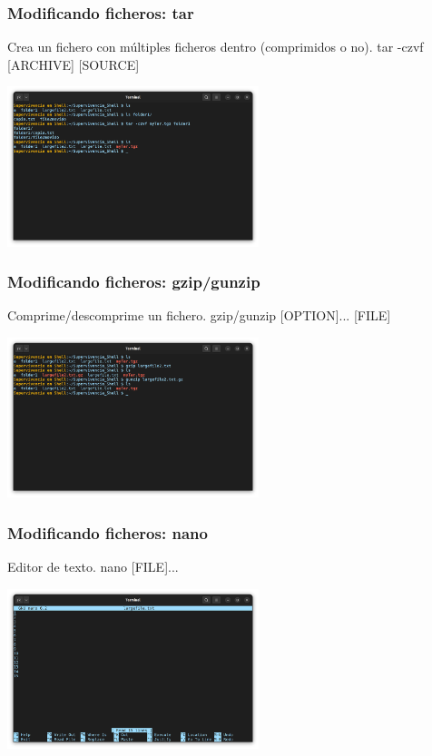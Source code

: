 \documentclass[10pt]{beamer}
\begin{document}
	\begin{frame}
		\frametitle{Modificando ficheros: tar}
		\begin{alertblock}{Crea un fichero con múltiples ficheros dentro (comprimidos o no).}
			tar -czvf [ARCHIVE] [SOURCE]
		\end{alertblock}
		\begin{center}
			\includegraphics[width=0.55\textwidth]{tar}
		\end{center}
	\end{frame}
	
	\begin{frame}
		\frametitle{Modificando ficheros: gzip/gunzip}
		\begin{alertblock}{Comprime/descomprime un fichero.}
			gzip/gunzip [OPTION]... [FILE]
		\end{alertblock}
		\begin{center}
			\includegraphics[width=0.55\textwidth]{gzip}
		\end{center}
	\end{frame}
		
	\begin{frame}
		\frametitle{Modificando ficheros: nano}
		\begin{alertblock}{Editor de texto.}
			nano [FILE]...
		\end{alertblock}
		\begin{center}
			\includegraphics[width=0.55\textwidth]{nano}
		\end{center}
	\end{frame}
	
\end{document}
